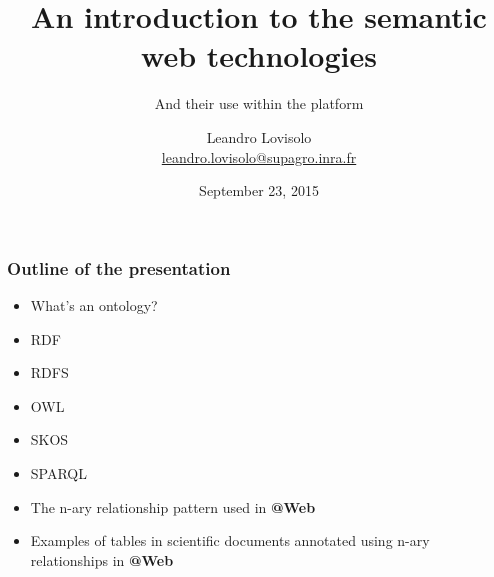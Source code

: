 \documentclass{beamer}
\title{An introduction to the semantic web technologies}
\subtitle{And their use within the \atweb platform}
\author{
  Leandro Lovisolo \\
  \footnotesize{\href{mailto:leandro.lovisolo@supagro.inra.fr}
                     {leandro.lovisolo@supagro.inra.fr}}
}
\date{September 23, 2015}
\institute{
  INRA SupAgro and INRIA GraphiK \\
  Montpellier, France
}
\makeatletter
\newcommand{\atweb}{\textbf{@Web}\xspace}
\makeatother
\begin{document}
\begin{frame}
  \titlepage
\end{frame}

\begin{frame}
  \frametitle{Outline of the presentation}

  \begin{itemize}
    \item What's an ontology?
    \item RDF
    \item RDFS
    \item OWL
    \item SKOS
    \item SPARQL
    \item The n-ary relationship pattern used in \atweb
    \item Examples of tables in scientific documents annotated using n-ary
      relationships in \atweb
  \end{itemize}
\end{frame}
\end{document}
